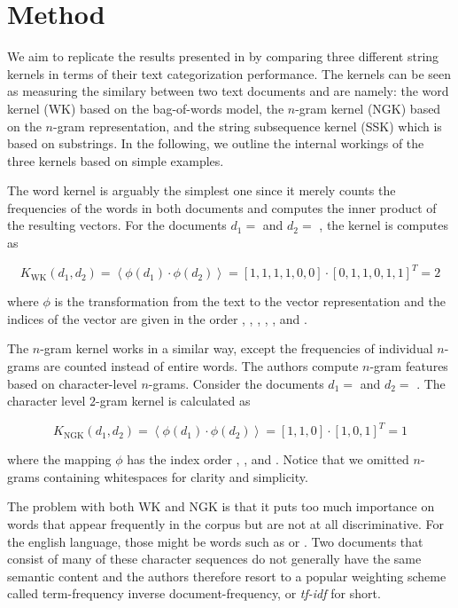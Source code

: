 \section{Method} \label{sec:method}

We aim to replicate the results presented in \cite{ssk} by comparing three different string kernels in terms of their text categorization performance. The kernels can be seen as measuring the similary between two text documents and are namely: the word kernel (WK) based on the bag-of-words model, the $n$-gram kernel (NGK) based on the $n$-gram representation, and the string subsequence kernel (SSK) which is based on substrings. In the following, we outline the internal workings of the three kernels based on simple examples.

The word kernel is arguably the simplest one since it merely counts the frequencies of the words in both documents and computes the inner product of the resulting vectors. For the documents $d_1 = $  and $d_2 = $ , the kernel is computes as

\begin{equation} \label{eq:wk}
  K_\text{WK}(d_1, d_2) = \left\langle \phi(d_1) \cdot \phi(d_2) \right\rangle = [1, 1, 1, 1, 0, 0] \cdot [0, 1, 1, 0, 1, 1]^T = 2
\end{equation}

where $\phi$ is the transformation from the text to the vector representation and the indices of the vector are given in the order , , , , , and .

The $n$-gram kernel works in a similar way, except the frequencies of individual $n$-grams are counted instead of entire words. The authors compute $n$-gram features based on character-level $n$-grams. Consider the documents $d_1 = $  and $d_2 = $ . The character level $2$-gram kernel is calculated as

\begin{equation} \label{eq:ngk}
 K_\text{NGK}(d_1, d_2) = \left\langle \phi(d_1) \cdot \phi(d_2) \right\rangle = [1, 1, 0] \cdot [1, 0, 1]^T = 1
\end{equation}

where the mapping $\phi$ has the index order , , and . Notice that we omitted $n$-grams containing whitespaces for clarity and simplicity.

The problem with both WK and NGK is that it puts too much importance on words that appear frequently in the corpus but are not at all discriminative. For the english language, those might be words such as  or . Two documents that consist of many of these character sequences do not generally have the same semantic content and the authors therefore resort to a popular weighting scheme called term-frequency inverse document-frequency, or \textit{tf-idf} for short.

